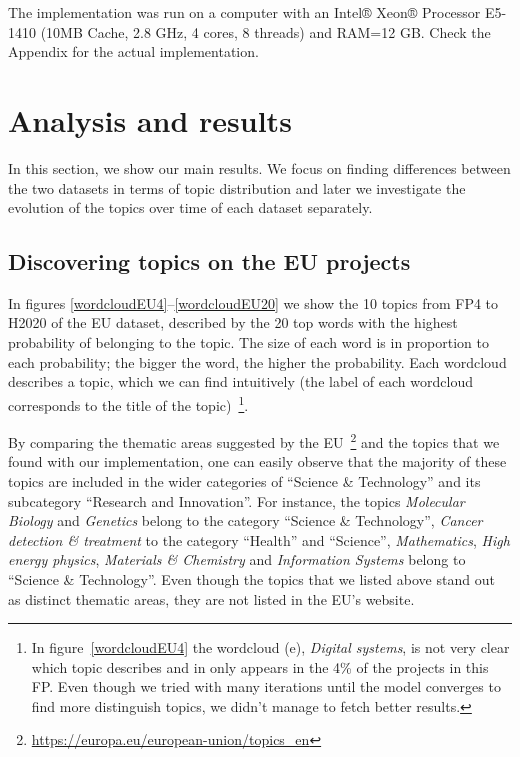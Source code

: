 \documentclass[12pt]{report}
\begin{document}
The implementation was run on a computer with an Intel® Xeon® Processor E5-1410
(10MB Cache, 2.8 GHz, 4 cores, 8 threads) and RAM=12 GB. Check the Appendix for 
the actual implementation.
\pagebreak

\section{Analysis and results}
\label{analysis}
In this section, we show our main results. We focus on finding
differences between the two datasets in terms of topic distribution
and later we investigate the evolution of the topics over time of each
dataset separately.

\subsection{Discovering topics on the EU projects}

In figures \ref{wordcloudEU4}--\ref{wordcloudEU20} we show the 10 topics from FP4 to H2020 of the EU dataset, described by
the 20 top words with the highest probability of belonging
to the topic. The size of each word is in proportion to each
probability; the bigger the word, the higher the probability. 
Each wordcloud describes a topic, which we can find intuitively (the label 
of each wordcloud corresponds to the title of the topic)~\footnote{In figure~\ref{wordcloudEU4} the wordcloud (e), \emph{Digital systems}, is not very 
clear which topic describes and in only appears in the 4\% of the projects 
in this FP. Even though we tried with many iterations 
until the model converges to find more distinguish topics, we didn't manage 
to fetch better results.}.

By comparing the thematic areas suggested by the EU~\footnote{\url{https://europa.eu/european-union/topics_en}} and the topics that
we found with our implementation, one can easily observe that the majority of
these topics are included in the wider categories of ``Science \& Technology''
and its subcategory ``Research and Innovation''. For instance, the topics
\emph{Molecular Biology} and \emph{Genetics} belong to the category ``Science \&
Technology'', \emph{Cancer detection \& treatment} to the category ``Health''
and ``Science'', \emph{Mathematics}, \emph{High energy physics}, \emph{Materials
\& Chemistry} and \emph{Information Systems} belong to ``Science \&
Technology''. Even though the topics that we listed above stand out as distinct
thematic areas, they are not listed in the EU's website.
\end{document}
